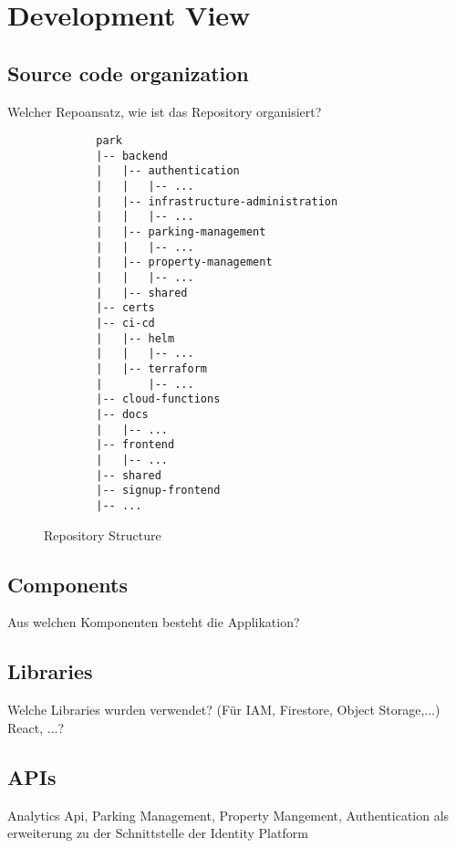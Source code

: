 \section{Development View}

\subsection{Source code organization}
Welcher Repoansatz, wie ist das Repository organisiert?


\begin{figure}[ht]
    \begin{verbatim}
        park
        |-- backend
        |   |-- authentication
        |   |   |-- ...
        |   |-- infrastructure-administration
        |   |   |-- ...
        |   |-- parking-management
        |   |   |-- ...
        |   |-- property-management
        |   |   |-- ...
        |   |-- shared
        |-- certs
        |-- ci-cd
        |   |-- helm
        |   |   |-- ...
        |   |-- terraform
        |       |-- ...
        |-- cloud-functions
        |-- docs
        |   |-- ...
        |-- frontend
        |   |-- ...
        |-- shared
        |-- signup-frontend
        |-- ...
    \end{verbatim}
    \caption{Repository Structure}
    \label{fig:repo-structure}
\end{figure}

\subsection{Components}
Aus welchen Komponenten besteht die Applikation?

\subsection{Libraries}
Welche Libraries wurden verwendet? (Für IAM, Firestore, Object Storage,...)
React, ...?

\subsection{APIs}

Analytics Api, Parking Management, Property Mangement, Authentication als erweiterung zu der Schnittstelle der Identity Platform